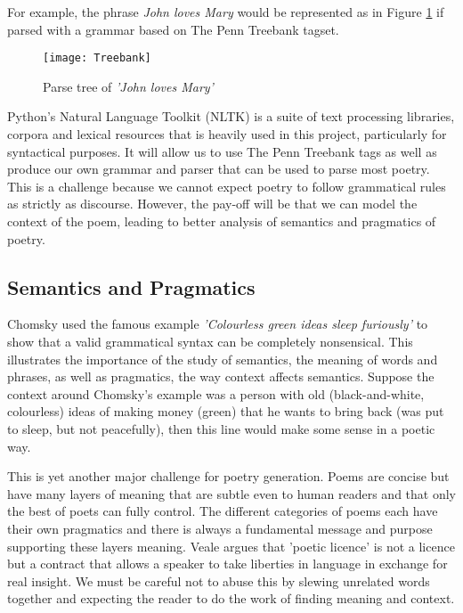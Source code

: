 For example, the phrase \textit{John loves Mary} would be represented as in Figure \ref{fig:parse} if parsed with a grammar based on The Penn Treebank tagset.

\begin{figure}[h!]
\centering
\texttt{[image: Treebank]}
\caption{Parse tree of \textit{'John loves Mary'}}
\label{fig:parse}
\end{figure}

Python's Natural Language Toolkit (NLTK)\cite{bird2009natural} is a suite of text processing libraries, corpora and lexical resources that is heavily used in this project, particularly for syntactical purposes. It will allow us to use The Penn Treebank tags as well as produce our own grammar and parser that can be used to parse most poetry. This is a challenge because we cannot expect poetry to follow grammatical rules as strictly as discourse. However, the pay-off will be that we can model the context of the poem, leading to better analysis of semantics and pragmatics of poetry.

\subsection{Semantics and Pragmatics}
Chomsky used the famous example \textit{'Colourless green ideas sleep furiously'} to show that a valid grammatical syntax can be completely nonsensical\cite{chomsky2002syntactic}. This illustrates the importance of the study of semantics, the meaning of words and phrases, as well as pragmatics, the way context affects semantics. Suppose the context around Chomsky's example was a person with old (black-and-white, colourless) ideas of making money (green) that he wants to bring back (was put to sleep, but not peacefully), then this line would make some sense in a poetic way.

This is yet another major challenge for poetry generation. Poems are concise but have many layers of meaning that are subtle even to human readers and that only the best of poets can fully control. The different categories of poems each have their own pragmatics and there is always a fundamental message and purpose supporting these layers meaning. Veale argues that 'poetic licence' is not a licence but a contract that allows a speaker to take liberties in language in exchange for real insight\cite{veale2013less}. We must be careful not to abuse this by slewing unrelated words together and expecting the reader to do the work of finding meaning and context.

